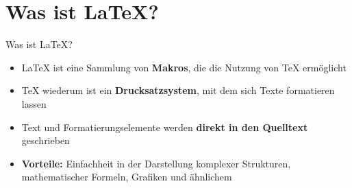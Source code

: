 \section{Was ist \LaTeX?}

\begin{frame}{Was ist \LaTeX?}
\begin{itemize}
    \item \LaTeX{} ist eine Sammlung von \textbf{Makros}, die die Nutzung von \TeX{} ermöglicht
    \newline
    \item \TeX{} wiederum ist ein \textbf{Drucksatzsystem}, mit dem sich Texte formatieren lassen
    \newline
    \item Text und Formatierungselemente werden \textbf{direkt in den Quelltext} geschrieben
    \newline
    \item \textbf{Vorteile:} Einfachheit in der Darstellung komplexer Strukturen, mathematischer Formeln, Grafiken und ähnlichem
\end{itemize}
    
\end{frame}

